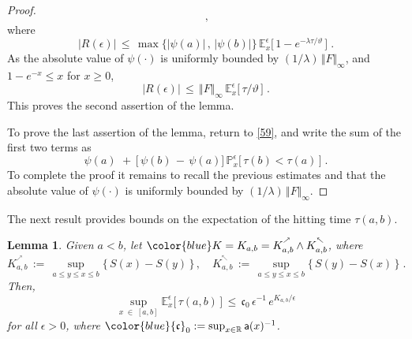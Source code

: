 \documentclass[reqno]{amsart}
\theoremstyle{plain}
\newtheorem{lemma}[theorem]{Lemma}
\theoremstyle{definition}
\newcommand{\mf}[1]{{\mathfrak #1}}
\newcommand{\bb}[1]{{\mathbb #1}}
\newcommand{\mss}[1]{{\textsf #1}}
\newcounter{as}[section]
\newcommand{\<}{\langle}
\renewcommand{\>}{\rangle}
\begin{document}
\begin{proof}
\begin{equation}
\;,
\end{equation}
where
\begin{equation*}
\big| R(\epsilon) \big| \,\le\, \max\big\{ |\psi (a)| \,,\,
|\psi (b)| \big\}
\, \bb E^{\epsilon}_{x}\Big[\, 1 - e^{-\lambda \tau/\vartheta} \, \Big] \;.
\end{equation*}
As the absolute value of $\psi (\cdot)$ is uniformly bounded
by $(1/\lambda) \, \Vert F\Vert_\infty$, and $1 - e^{-x} \le x$ for
$x\ge 0$,
\begin{equation*}
\big| R(\epsilon) \big| \,\le\, \Vert F \Vert_\infty
\, \bb E^{\epsilon}_{x}\big[\,\tau/\vartheta \, \big] \;.
\end{equation*}
This proves the second assertion of the lemma.

To prove the last assertion of the lemma, return to \eqref{59}, and
write the sum of the first two terms as
\begin{equation*}
\psi (a) \, 
\,+\,
\big[\, \psi (b) \,-\, \psi (a) \big]
\, \bb P^{\epsilon}_{x}\big[\, 
\tau(b)< \tau(a)\, \big] \;.
\end{equation*}
To complete the proof it remains to recall the previous estimates and
that the absolute value of $\psi (\cdot)$ is uniformly bounded
by $(1/\lambda) \, \Vert F\Vert_\infty$.
\end{proof}

The next result provides bounds on the expectation of the hitting time
$\tau(a,b)$.

\begin{lemma}
\label{l01}
Given $a < b$, let $\color{blue} K = K_{a,b} = K^{^{\nearrow}}_{a,b} \wedge
K^{^\nwarrow}_{a,b}$, where
\begin{equation*}
K^{^{\nearrow}}_{a,b} \,:=\, \sup_{a \le y\le x \le b} \{\,
S(x)-S(y)\,\}\,, \quad
K^{^\nwarrow}_{a,b} \,:=\,
\sup_{a \le y\le x \le b} \{\, S(y)-S(x)\,\} \;.
\end{equation*}
Then, 
\begin{equation*}
\sup_{x\;\in\; [a,b]}\bb
E^{\epsilon}_{x}\big[\, \tau(a,b)\, \big]
\, \leq\, \mf c_0\, \epsilon^{-1}\, e^{K_{a,b}/\epsilon}
\end{equation*}
for all $\epsilon > 0$, where
${\color{blue} \mf c_0 }:= \sup_{x\in \bb R} \mss a (x)^{-1}$.
\end{lemma}
\end{document}
